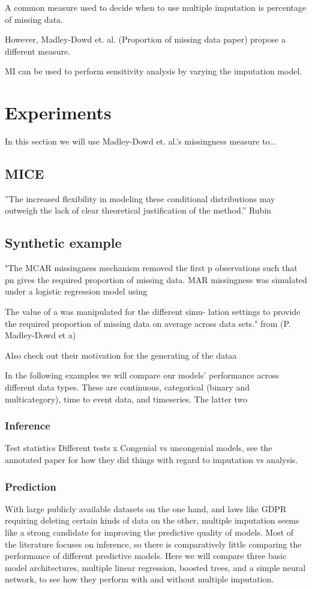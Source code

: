 \documentclass{article}
\begin{document}
	A common measure used to decide when to use multiple imputation is percentage of missing data.
	
	However, Madley-Dowd et. al. (Proportion of missing data paper) propose a different measure.
	
	MI can be used to perform sensitivity analysis by varying the imputation model.
	
	\section{Experiments}
	In this section we will use Madley-Dowd et. al.'s missingness measure to...
	
	\subsection{MICE}
	''The
	increased flexibility in modeling these conditional distributions may outweigh
	the lack of clear theoretical justification of the method.'' Rubin
	
	\subsection{Synthetic example}
	
	"The MCAR missingness mechanism
	removed the first p observations such that pn gives the
	required proportion of missing data. MAR missingness
	was simulated under a logistic regression model using
	
	The value of a was manipulated for the different simu-
	lation settings to provide the required proportion of missing
	data on average across data sets." from (P. Madley-Dowd et a)
	
	Also check out their motivation for the generating of the dataa
	
	
	In the following examples we will compare our models' performance across different data types. These are continuous, categorical (binary and multicategory), time to event data, and timeseries. The latter two 
	
	\subsubsection{Inference}
	Test statistics
	Different tests
	x
	Congenial vs uncongenial models, see the annotated paper for how they did things with regard to imputation vs analysis. 
	
	\subsubsection{Prediction}
	With large publicly available datasets on the one hand, and laws like GDPR requiring deleting certain kinds of data on the other, multiple imputation seems like a strong candidate for improving the predictive quality of models. Most of the literature focuses on inference, so there is comparatively little comparing the performance of different predictive models. Here we will compare three basic model architectures, multiple linear regression, boosted trees, and a simple neural network, to see how they perform with and without multiple imputation.
	
\end{document}
